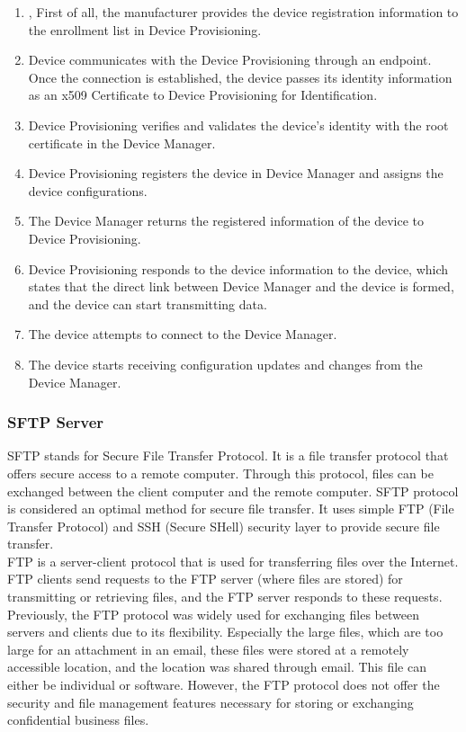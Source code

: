 \documentclass[12pt,a4paper]{article}
\begin{document}
{\begin{enumerate}
\item, First of all, the manufacturer provides the device registration information to the enrollment list in Device Provisioning. \cite{r36}
\item Device communicates with the Device Provisioning through an endpoint. Once the connection is established, the device passes its identity information as an x509 Certificate to Device Provisioning for Identification. \cite{r36}
\item Device Provisioning verifies and validates the device's identity with the root certificate in the Device Manager. \cite{r36}
\item Device Provisioning registers the device in Device Manager and assigns the device configurations. \cite{r36}
\item The Device Manager returns the registered information of the device to Device Provisioning. \cite{r36}
\item Device Provisioning responds to the device information to the device, which states that the direct link between Device Manager and the device is formed, and the device can start transmitting data. \cite{r36}
\item The device attempts to connect to the Device Manager.
\item The device starts receiving configuration updates and changes from the Device Manager. \cite{r36}

\end{enumerate}

\subsubsection{SFTP Server}

SFTP stands for Secure File Transfer Protocol. It is a file transfer protocol that offers secure access to a remote computer. Through this protocol, files can be exchanged between the client computer and the remote computer. SFTP protocol is considered an optimal method for secure file transfer. It uses simple FTP (File Transfer Protocol) and SSH (Secure SHell) security layer to provide secure file transfer. \cite{r37} \\

FTP is a server-client protocol that is used for transferring files over the Internet. FTP clients send requests to the FTP server (where files are stored) for transmitting or retrieving files, and the FTP server responds to these requests. Previously, the FTP protocol was widely used for exchanging files between servers and clients due to its flexibility. Especially the large files, which are too large for an attachment in an email, these files were stored at a remotely accessible location, and the location was shared through email. This file can either be individual or software. However, the FTP protocol does not offer the security and file management features necessary for storing or exchanging confidential business files. \cite{r37} \\

}
\end{document}
